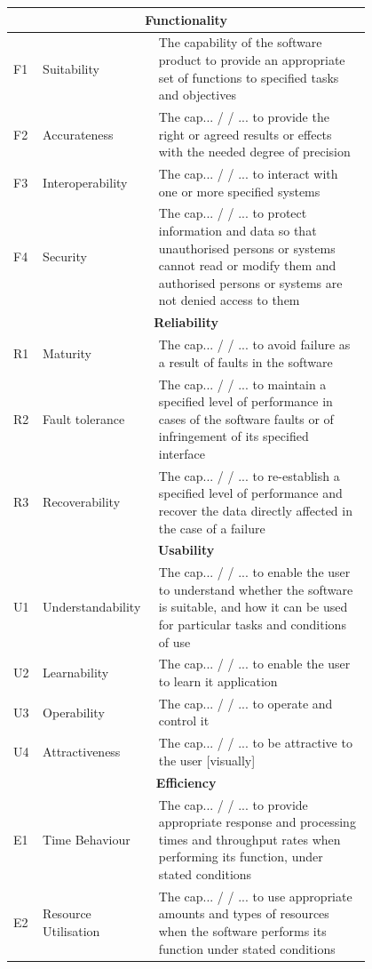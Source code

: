 \documentclass{article}
\begin{document}
\begin{table}[H]
\centering
\begin{tabular}{|p{0.05\linewidth}|p{0.2\linewidth}|p{0.55\linewidth}|}
\hline

\multicolumn{3}{c}{\textbf{Functionality}} \\ \hline
F1 & Suitability &The capability of the software product to provide an appropriate set of
functions to specified tasks and objectives \\ \hline
F2 & Accurateness & The cap... / / ... to provide the right or agreed results or effects with the needed
degree of precision \\ \hline
F3 & Interoperability& The cap... / / ... to interact with one or more specified systems \\ \hline
F4  & Security& The cap... / / ... to protect information and data so that unauthorised persons or systems
cannot read or modify them and authorised persons or systems are not denied access to them \\ \hline

\multicolumn{3}{c}{\textbf{Reliability}} \\ \hline
R1 & Maturity & The cap... / / ... to avoid failure as a result of faults in the software \\
\hline
R2 & Fault tolerance & The cap... / / ... to maintain a specified level of performance in cases of the
software faults or of infringement of its specified interface \\ \hline
R3 & Recoverability & The cap... / / ... to re-establish a specified level of performance and recover the
data directly affected in the case of a failure \\ \hline

\multicolumn{3}{c}{\textbf{Usability}} \\ \hline
U1 & Understandability & The cap... / / ... to enable the user to understand whether the
software is suitable, and how it can be used for particular tasks and conditions of use \\ \hline
U2&Learnability & The cap... / / ... to enable the user to learn it application \\ \hline
U3&Operability & The cap... / / ... to operate and control it \\ \hline
U4&Attractiveness& The cap... / / ... to be attractive to the user [visually] \\ \hline

\multicolumn{3}{c}{\textbf{Efficiency}} \\ \hline
E1&Time Behaviour & The cap... / / ... to provide appropriate response and processing times and
throughput rates when performing its function, under stated conditions \\ \hline
E2&Resource Utilisation & The cap... / / ... to use appropriate amounts and types of resources when the software
performs its function under stated conditions \\ \hline
\end{tabular}
\end{table}
\end{document}
